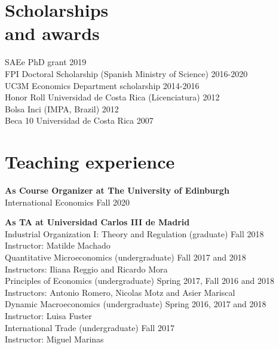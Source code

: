 \documentclass[margin]{res} %
\begin{document}
\begin{resume}
\section{Scholarships \\ and awards} 

SAEe PhD grant \hfill 2019\\
FPI Doctoral Scholarship (Spanish Ministry of Science) \hfill 2016-2020 \\
UC3M Economics Department scholarship \hfill 2014-2016 \\
Honor Roll Universidad de Costa Rica (Licenciatura) \hfill 2012 \\ 
Bolsa Inci (IMPA, Brazil) \hfill 2012 \\
Beca 10 Universidad de Costa Rica \hfill 2007


\section{Teaching experience}

{\bf As Course Organizer at The University of Edinburgh} \\
International Economics \hfill Fall 2020

{\bf As TA at Universidad Carlos III de Madrid} \\
Industrial Organization I: Theory and Regulation (graduate) \hfill Fall 2018 \\
Instructor: Matilde Machado \\
Quantitative Microeconomics (undergraduate) \hfill Fall 2017 and 2018 \\
Instructors: Iliana Reggio and Ricardo Mora \\
Principles of Economics (undergraduate) \hfill Spring 2017, Fall 2016 and 2018 \\
Instructors: Antonio Romero, Nicolas Motz and Asier Mariscal \\
Dynamic Macroeconomics (undergraduate) \hfill Spring 2016, 2017 and 2018 \\
Instructor: Luisa Fuster \\
International Trade (undergraduate) \hfill Fall 2017 \\ 
Instructor: Miguel Marinas 

%


\end{resume}
\end{document}
